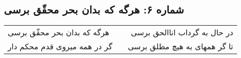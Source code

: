 \begin{center}
\section*{شماره ۶: هرگه که بدان بحر محقّق برسی}
\label{sec:006}
\begin{longtable}{l p{0.5cm} r}
هرگه که بدان بحر محقّق برسی
&&
در حال به گرداب اناالحق برسی
\\
گر در همه میروی قدم محکم دار
&&
تا گر همهای به هیچ مطلق برسی
\\
\end{longtable}
\end{center}
